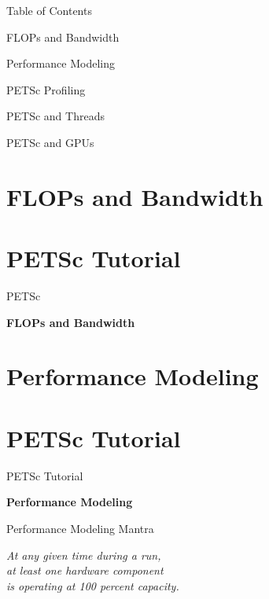 


\begin{frame}{Table of Contents}
   \begin{block}{FLOPs and Bandwidth} \end{block}
   \begin{block}{Performance Modeling} \end{block}
   \begin{block}{PETSc Profiling} \end{block}
   \begin{block}{PETSc and Threads} \end{block}
   \begin{block}{PETSc and GPUs} \end{block}
\end{frame}



%
%
\section{FLOPs and Bandwidth}

\section{PETSc Tutorial}
\begin{frame}{PETSc}
   \begin{center} \Large \textbf{FLOPs and Bandwidth} \end{center}
\end{frame}




%
%
\section{Performance Modeling}

\section{PETSc Tutorial}
\begin{frame}{PETSc Tutorial}
   \begin{center} \Large \textbf{Performance Modeling} \end{center}
\end{frame}

\begin{frame}{Performance Modeling Mantra}
  \begin{center}
   \LARGE \hspace*{-1cm} \emph{At any given time during a run, \\
                               at least one hardware component\\
                               is operating at 100 percent capacity.}
  \end{center}
\end{frame}

